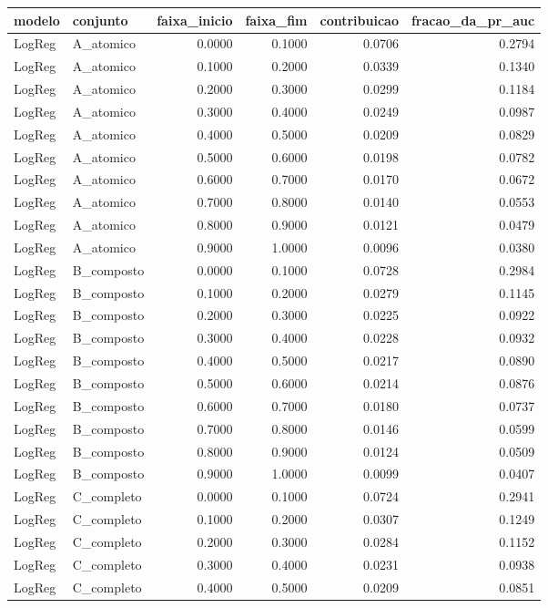 \begin{tabular}{llrrrr}
\toprule
modelo & conjunto & faixa_inicio & faixa_fim & contribuicao & fracao_da_pr_auc \\
\midrule
LogReg & A_atomico & 0.0000 & 0.1000 & 0.0706 & 0.2794 \\
LogReg & A_atomico & 0.1000 & 0.2000 & 0.0339 & 0.1340 \\
LogReg & A_atomico & 0.2000 & 0.3000 & 0.0299 & 0.1184 \\
LogReg & A_atomico & 0.3000 & 0.4000 & 0.0249 & 0.0987 \\
LogReg & A_atomico & 0.4000 & 0.5000 & 0.0209 & 0.0829 \\
LogReg & A_atomico & 0.5000 & 0.6000 & 0.0198 & 0.0782 \\
LogReg & A_atomico & 0.6000 & 0.7000 & 0.0170 & 0.0672 \\
LogReg & A_atomico & 0.7000 & 0.8000 & 0.0140 & 0.0553 \\
LogReg & A_atomico & 0.8000 & 0.9000 & 0.0121 & 0.0479 \\
LogReg & A_atomico & 0.9000 & 1.0000 & 0.0096 & 0.0380 \\
LogReg & B_composto & 0.0000 & 0.1000 & 0.0728 & 0.2984 \\
LogReg & B_composto & 0.1000 & 0.2000 & 0.0279 & 0.1145 \\
LogReg & B_composto & 0.2000 & 0.3000 & 0.0225 & 0.0922 \\
LogReg & B_composto & 0.3000 & 0.4000 & 0.0228 & 0.0932 \\
LogReg & B_composto & 0.4000 & 0.5000 & 0.0217 & 0.0890 \\
LogReg & B_composto & 0.5000 & 0.6000 & 0.0214 & 0.0876 \\
LogReg & B_composto & 0.6000 & 0.7000 & 0.0180 & 0.0737 \\
LogReg & B_composto & 0.7000 & 0.8000 & 0.0146 & 0.0599 \\
LogReg & B_composto & 0.8000 & 0.9000 & 0.0124 & 0.0509 \\
LogReg & B_composto & 0.9000 & 1.0000 & 0.0099 & 0.0407 \\
LogReg & C_completo & 0.0000 & 0.1000 & 0.0724 & 0.2941 \\
LogReg & C_completo & 0.1000 & 0.2000 & 0.0307 & 0.1249 \\
LogReg & C_completo & 0.2000 & 0.3000 & 0.0284 & 0.1152 \\
LogReg & C_completo & 0.3000 & 0.4000 & 0.0231 & 0.0938 \\
LogReg & C_completo & 0.4000 & 0.5000 & 0.0209 & 0.0851 \\

\end{tabular}
